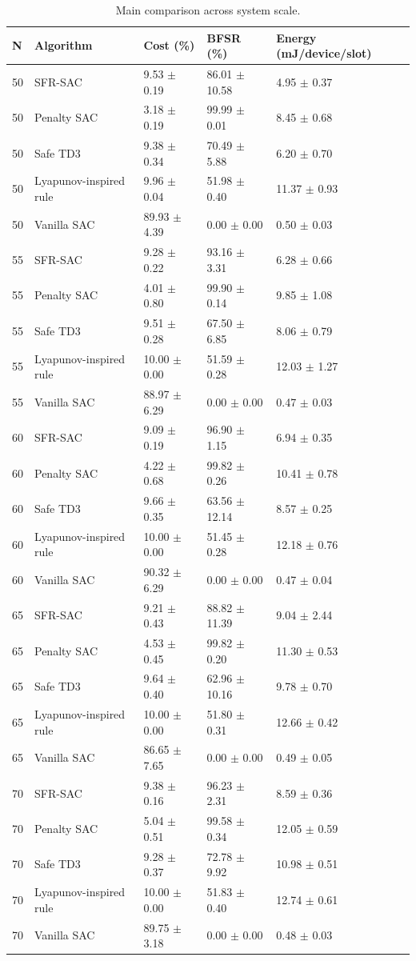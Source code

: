\begin{table}[t]
\centering
\caption{Main comparison across system scale.}
\label{tab:main_results}
\begin{tabular}{lllll}
\toprule
N & Algorithm & Cost (\%) & BFSR (\%) & Energy (mJ/device/slot) \\
\midrule
50 & SFR-SAC & 9.53 $\pm$ 0.19 & 86.01 $\pm$ 10.58 & 4.95 $\pm$ 0.37 \\
50 & Penalty SAC & 3.18 $\pm$ 0.19 & 99.99 $\pm$ 0.01 & 8.45 $\pm$ 0.68 \\
50 & Safe TD3 & 9.38 $\pm$ 0.34 & 70.49 $\pm$ 5.88 & 6.20 $\pm$ 0.70 \\
50 & Lyapunov-inspired rule & 9.96 $\pm$ 0.04 & 51.98 $\pm$ 0.40 & 11.37 $\pm$ 0.93 \\
50 & Vanilla SAC & 89.93 $\pm$ 4.39 & 0.00 $\pm$ 0.00 & 0.50 $\pm$ 0.03 \\
55 & SFR-SAC & 9.28 $\pm$ 0.22 & 93.16 $\pm$ 3.31 & 6.28 $\pm$ 0.66 \\
55 & Penalty SAC & 4.01 $\pm$ 0.80 & 99.90 $\pm$ 0.14 & 9.85 $\pm$ 1.08 \\
55 & Safe TD3 & 9.51 $\pm$ 0.28 & 67.50 $\pm$ 6.85 & 8.06 $\pm$ 0.79 \\
55 & Lyapunov-inspired rule & 10.00 $\pm$ 0.00 & 51.59 $\pm$ 0.28 & 12.03 $\pm$ 1.27 \\
55 & Vanilla SAC & 88.97 $\pm$ 6.29 & 0.00 $\pm$ 0.00 & 0.47 $\pm$ 0.03 \\
60 & SFR-SAC & 9.09 $\pm$ 0.19 & 96.90 $\pm$ 1.15 & 6.94 $\pm$ 0.35 \\
60 & Penalty SAC & 4.22 $\pm$ 0.68 & 99.82 $\pm$ 0.26 & 10.41 $\pm$ 0.78 \\
60 & Safe TD3 & 9.66 $\pm$ 0.35 & 63.56 $\pm$ 12.14 & 8.57 $\pm$ 0.25 \\
60 & Lyapunov-inspired rule & 10.00 $\pm$ 0.00 & 51.45 $\pm$ 0.28 & 12.18 $\pm$ 0.76 \\
60 & Vanilla SAC & 90.32 $\pm$ 6.29 & 0.00 $\pm$ 0.00 & 0.47 $\pm$ 0.04 \\
65 & SFR-SAC & 9.21 $\pm$ 0.43 & 88.82 $\pm$ 11.39 & 9.04 $\pm$ 2.44 \\
65 & Penalty SAC & 4.53 $\pm$ 0.45 & 99.82 $\pm$ 0.20 & 11.30 $\pm$ 0.53 \\
65 & Safe TD3 & 9.64 $\pm$ 0.40 & 62.96 $\pm$ 10.16 & 9.78 $\pm$ 0.70 \\
65 & Lyapunov-inspired rule & 10.00 $\pm$ 0.00 & 51.80 $\pm$ 0.31 & 12.66 $\pm$ 0.42 \\
65 & Vanilla SAC & 86.65 $\pm$ 7.65 & 0.00 $\pm$ 0.00 & 0.49 $\pm$ 0.05 \\
70 & SFR-SAC & 9.38 $\pm$ 0.16 & 96.23 $\pm$ 2.31 & 8.59 $\pm$ 0.36 \\
70 & Penalty SAC & 5.04 $\pm$ 0.51 & 99.58 $\pm$ 0.34 & 12.05 $\pm$ 0.59 \\
70 & Safe TD3 & 9.28 $\pm$ 0.37 & 72.78 $\pm$ 9.92 & 10.98 $\pm$ 0.51 \\
70 & Lyapunov-inspired rule & 10.00 $\pm$ 0.00 & 51.83 $\pm$ 0.40 & 12.74 $\pm$ 0.61 \\
70 & Vanilla SAC & 89.75 $\pm$ 3.18 & 0.00 $\pm$ 0.00 & 0.48 $\pm$ 0.03 \\
\bottomrule
\end{tabular}
\end{table}
